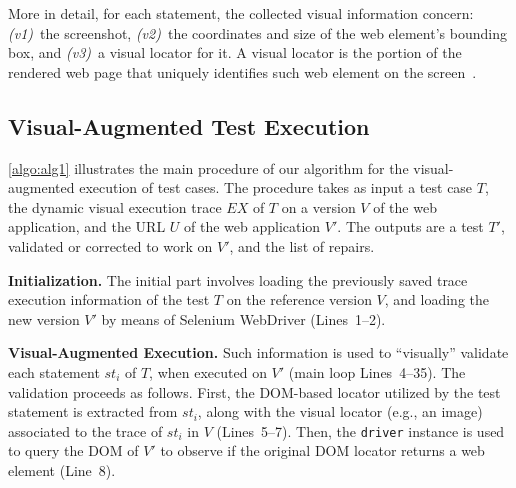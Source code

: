 
More in detail, for each statement, 
the collected visual information concern: \textit{(v1)}~the screenshot, \textit{(v2)}~the coordinates and size of the web element's bounding box, and \textit{(v3)}~a visual locator for it. A visual locator is the portion of the rendered web page that uniquely identifies such web element on the screen~\cite{2015-Leotta-SAC}. 
%

\subsection{Visual-Augmented Test Execution}

\autoref{algo:alg1} illustrates the main procedure of our algorithm for the visual-augmented execution of test cases. The procedure takes as input a test case $T$, 
the dynamic visual execution trace $EX$ of $T$ on a version $V$ of the web application, and the URL $U$ of the web application $V'$. The outputs are a test $T'$, validated or corrected to work on $V'$, and the list of repairs. 

\noindent
\textbf{Initialization.} 
The initial part involves loading the previously saved trace execution information of the test $T$ on the reference version $V$, and loading the new version $V'$ by means of Selenium WebDriver (Lines~1--2). 

\noindent
\textbf{Visual-Augmented Execution.}
Such information is used to ``visually'' validate each statement $st_i$ of $T$, when executed on $V'$ (main loop Lines~4--35). The validation proceeds as follows. First, the DOM-based locator utilized by the test statement is extracted from $st_i$, along with the visual locator (e.g., an image) associated to the trace of $st_i$ in $V$  (Lines~5--7). Then, the \texttt{driver} instance is used to query the DOM of $V'$ to observe if the original DOM locator returns a web element (Line~8). 

